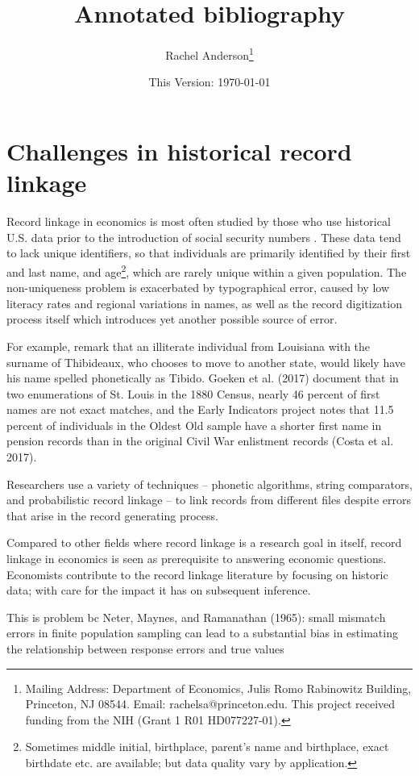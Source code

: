 \documentclass[12pt]{article}
\title{\singlespacing Annotated bibliography}
\author{\singlespacing \vspace{-50pt} Rachel Anderson\thanks{Mailing Address: Department of Economics, Julis Romo Rabinowitz Building, Princeton, NJ 08544. Email: rachelsa@princeton.edu. This project received funding from the NIH (Grant 1 R01 HD077227-01). }}
\date{\vspace{-40pt} This Version: \today}
\begin{document}
\doublespacing
\maketitle

\section{Challenges in historical record linkage}
Record linkage in economics is most often studied by those who use historical U.S. data prior to the introduction of social security numbers \citep{abe2019,aizer2016,ferrie96}.  These data tend to lack unique identifiers, so that individuals are primarily identified by their first and last name, and age\footnote{Sometimes middle initial, birthplace, parent's name and birthplace, exact birthdate etc. are available; but data quality vary by application.}, which are rarely unique within a given population.   The non-uniqueness problem is exacerbated by typographical error, caused by low literacy rates and regional variations in names, as well as the record digitization process itself which introduces yet another possible source of error.    

For example, \cite{nq2015} remark that an illiterate individual from Louisiana with the surname of Thibideaux, who chooses to move to another state, would likely have his name spelled phonetically as Tibido.  Goeken et al. (2017) document that in two enumerations of St. Louis in the 1880 Census, nearly 46 percent of first names are not exact matches, and the Early Indicators project notes that 11.5 percent of individuals in the Oldest Old sample have a shorter first name in pension records than in the original Civil War enlistment records (Costa et al. 2017). 

Researchers use a variety of techniques -- phonetic algorithms, string comparators, and probabilistic record linkage -- to link records from different files despite errors that arise in the record generating process.  

Compared to other fields where record linkage is a research goal in itself, record linkage in economics is seen as prerequisite to answering economic questions.  Economists contribute to the record linkage literature by focusing on historic data; with care for the impact it has on subsequent inference.   

This is problem bc  Neter, Maynes, and Ramanathan (1965): small mismatch errors in finite population sampling can lead to a substantial bias in estimating the relationship between response errors and true values
\end{document}
